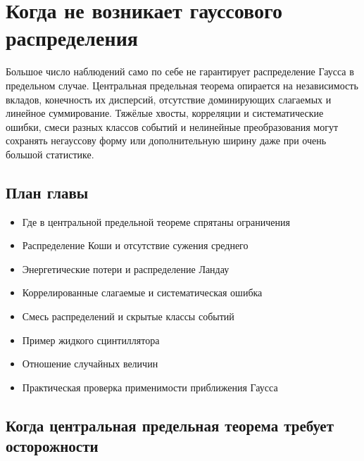 \documentclass[
  russian,
  12pt,
  a4paper,
  a4paper,
  openany]{scrbook}
\providecommand{\tightlist}{%
  \setlength{\itemsep}{0pt}\setlength{\parskip}{0pt}}
\begin{document}
\chapter{Когда не возникает гауссового
распределения}\label{ux43aux43eux433ux434ux430-ux43dux435-ux432ux43eux437ux43dux438ux43aux430ux435ux442-ux433ux430ux443ux441ux441ux43eux432ux43eux433ux43e-ux440ux430ux441ux43fux440ux435ux434ux435ux43bux435ux43dux438ux44f}

\begin{bookchapteropening}

Большое число наблюдений само по себе не гарантирует распределение
Гаусса в предельном случае. Центральная предельная теорема опирается на
независимость вкладов, конечность их дисперсий, отсутствие доминирующих
слагаемых и линейное суммирование. Тяжёлые хвосты, корреляции и
систематические ошибки, смеси разных классов событий и нелинейные
преобразования могут сохранять негауссову форму или дополнительную
ширину даже при очень большой статистике.

\end{bookchapteropening}

\section{План
главы}\label{ux43fux43bux430ux43d-ux433ux43bux430ux432ux44b-3}

\begin{itemize}
\tightlist
\item
  Где в центральной предельной теореме спрятаны ограничения
\item
  Распределение Коши и отсутствие сужения среднего
\item
  Энергетические потери и распределение Ландау
\item
  Коррелированные слагаемые и систематическая ошибка
\item
  Смесь распределений и скрытые классы событий
\item
  Пример жидкого сцинтиллятора
\item
  Отношение случайных величин
\item
  Практическая проверка применимости приближения Гаусса
\end{itemize}

\section{Когда центральная предельная теорема требует
осторожности}\label{ux43aux43eux433ux434ux430-ux446ux435ux43dux442ux440ux430ux43bux44cux43dux430ux44f-ux43fux440ux435ux434ux435ux43bux44cux43dux430ux44f-ux442ux435ux43eux440ux435ux43cux430-ux442ux440ux435ux431ux443ux435ux442-ux43eux441ux442ux43eux440ux43eux436ux43dux43eux441ux442ux438}
\end{document}

